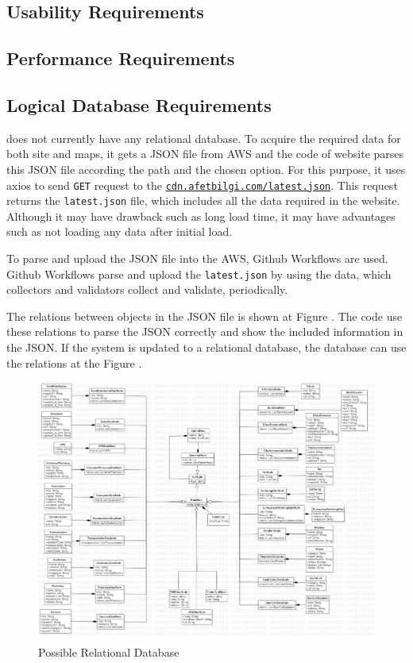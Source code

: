 \subsection{Usability Requirements}

\subsection{Performance Requirements}

\subsection{Logical Database Requirements}

\afetbilgi does not currently have any relational database. To acquire the required data for both site and maps, it gets a JSON file from AWS and the code of website parses this JSON file according the path and the chosen option. For this purpose, it uses axios to send \texttt{GET} request to the \href{https://cdn.afetbilgi.com/latest.json}{\texttt{cdn.afetbilgi.com/latest.json}}. This request returns the \texttt{latest.json} file, which includes all the data required in the website. Although it may have drawback such as long load time, it may have advantages such as not loading any data after initial load.

To parse and upload the JSON file into the AWS, Github Workflows are used. Github Workflows parse and upload the \texttt{latest.json} by using the data, which collectors and validators collect and validate, periodically.

The relations between objects in the JSON file is shown at Figure . The code use these relations to parse the JSON correctly and show the included information in the JSON. If the system is updated to a relational database, the database can use the relations at the Figure .

\begin{figure}[H]
    \centering
    \includegraphics[width=\textwidth]{img/database.jpg}
    \caption{Possible Relational Database}
\end{figure}

